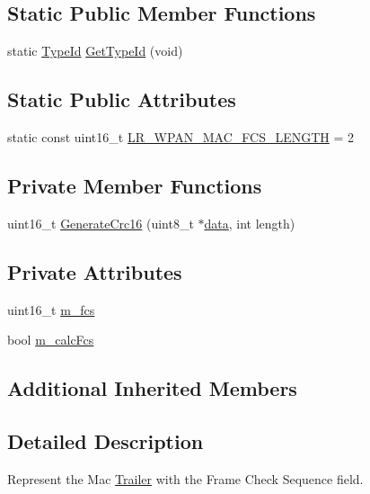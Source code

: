 \subsection*{Static Public Member Functions}
\begin{DoxyCompactItemize}
\item 
static \hyperlink{classns3_1_1TypeId}{Type\+Id} \hyperlink{classns3_1_1LrWpanMacTrailer_af25f2ea14fe5aaa4fa3f2a3a6067fc4e}{Get\+Type\+Id} (void)
\end{DoxyCompactItemize}
\subsection*{Static Public Attributes}
\begin{DoxyCompactItemize}
\item 
static const uint16\+\_\+t \hyperlink{classns3_1_1LrWpanMacTrailer_a7fb9fd20bbe032e1be52e07a23348feb}{L\+R\+\_\+\+W\+P\+A\+N\+\_\+\+M\+A\+C\+\_\+\+F\+C\+S\+\_\+\+L\+E\+N\+G\+TH} = 2
\end{DoxyCompactItemize}
\subsection*{Private Member Functions}
\begin{DoxyCompactItemize}
\item 
uint16\+\_\+t \hyperlink{classns3_1_1LrWpanMacTrailer_a834005b6ad953ca027a5782a93613718}{Generate\+Crc16} (uint8\+\_\+t $\ast$\hyperlink{topology-example-sim_8cc_a26c65296e316af77b787dc77469bb2a4}{data}, int length)
\end{DoxyCompactItemize}
\subsection*{Private Attributes}
\begin{DoxyCompactItemize}
\item 
uint16\+\_\+t \hyperlink{classns3_1_1LrWpanMacTrailer_a86cd487d10f4d7072a1a50d53640eb64}{m\+\_\+fcs}
\item 
bool \hyperlink{classns3_1_1LrWpanMacTrailer_a13461a0773b090951d9807e5849463c7}{m\+\_\+calc\+Fcs}
\end{DoxyCompactItemize}
\subsection*{Additional Inherited Members}


\subsection{Detailed Description}
Represent the Mac \hyperlink{classns3_1_1Trailer}{Trailer} with the Frame Check Sequence field. 

